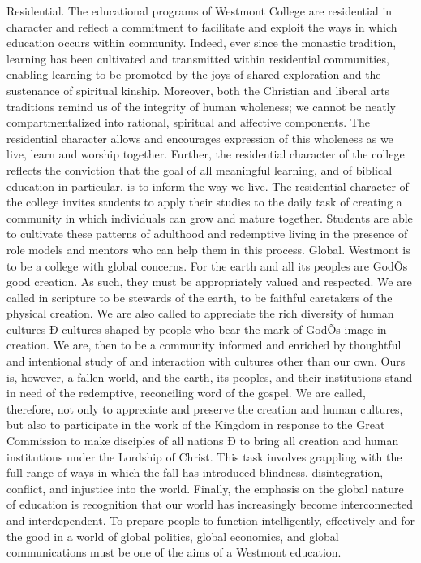\documentclass[letterpaper, 11pt]{article}
\begin{document}
   Residential.  The educational programs of Westmont College are residential in character and reflect a commitment to facilitate and exploit the ways in which education occurs within community.  Indeed, ever since the monastic tradition, learning has been cultivated and transmitted within residential communities, enabling learning to be promoted by the joys of shared exploration and the sustenance of spiritual kinship.  Moreover, both the Christian and liberal arts traditions remind us of the integrity of human wholeness; we cannot be neatly compartmentalized into rational, spiritual and affective components.  The residential character allows and encourages expression of this wholeness as we live, learn and worship together.  Further, the residential character of the college reflects the conviction that the goal of all meaningful learning, and of biblical education in particular, is to inform the way we live.  The residential character of the college invites students to apply their studies to the daily task of creating a community in which individuals can grow and mature together.  Students are able to cultivate these patterns of adulthood and redemptive living in the presence of role models and mentors who can help them in this process.
   Global.  Westmont is to be a college with global concerns.  For the earth and all its peoples are GodÕs good creation.  As such, they must be appropriately valued and respected.  We are called in scripture to be stewards of the earth, to be faithful caretakers of the physical creation.  We are also called to appreciate the rich diversity of human cultures Ð cultures shaped by people who bear the mark of GodÕs image in creation.  We are, then to be a community informed and enriched by thoughtful and intentional study of and interaction with cultures other than our own.  Ours is, however, a fallen world, and the earth, its peoples, and their institutions stand in need of the redemptive, reconciling word of the gospel.  We are called, therefore, not only to appreciate and preserve the creation and human cultures, but also to participate in the work of the Kingdom in response to the Great Commission to make disciples of all nations Ð to bring all creation and human institutions under the Lordship of Christ.  This task involves grappling with the full range of ways in which the fall has introduced blindness, disintegration, conflict, and injustice into the world.  Finally, the emphasis on the global nature of education is recognition that our world has increasingly become interconnected and interdependent.  To prepare people to function intelligently, effectively and for the good in a world of global politics, global economics, and global communications must be one of the aims of a Westmont education.
\end{document}
